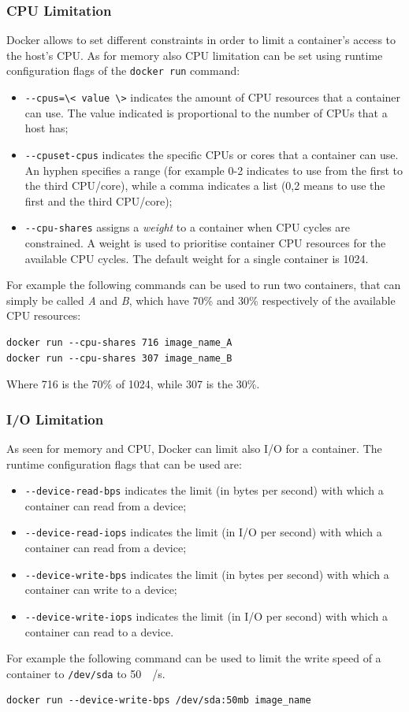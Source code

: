 \documentclass[a4paper,12pt]{article}
\newcommand{\file}[1]{\texttt{#1}\xspace}
\newcommand{\code}[1]{\lstinline|#1|}
\begin{document}
\subsubsection{CPU Limitation} 

Docker allows to set different constraints in order to limit a container's
access to the host's CPU. As for memory also CPU limitation can be set using
runtime configuration flags of the \code{docker run} command:
\begin{itemize}
  \item \code{--cpus=\< value \>} indicates the amount of CPU
  resources that a container can use. The value indicated is proportional to the
  number of CPUs that a host has;
  \item \code{--cpuset-cpus} indicates the specific CPUs or cores that a
  container can use. An hyphen specifies a range (for example 0-2 indicates to
  use from the first to the third CPU/core), while a comma indicates a list
  (0,2 means to use the first and the third CPU/core);
  \item \code{--cpu-shares} assigns a \textit{weight} to a container  when CPU
  cycles are constrained. A weight is used to prioritise container CPU resources
  for the available CPU cycles. The default weight for a single container is
  1024.
\end{itemize}
For example the following commands can be used to run two containers, that can
simply be called \textit{A} and \textit{B}, which have 70\% and 30\%
respectively of the available CPU resources:
\begin{lstlisting}
docker run --cpu-shares 716 image_name_A
docker run --cpu-shares 307 image_name_B
\end{lstlisting}
Where 716 is the 70\% of 1024, while 307 is the 30\%.


\subsubsection{I/O Limitation}

As seen for memory and CPU, Docker can limit also I/O for a container. The
runtime configuration flags that can be used are: 
\begin{itemize}
  \item \code{--device-read-bps} indicates the limit (in bytes per second)
  with which a container can read from a device;
  \item \code{--device-read-iops} indicates the limit (in I/O per second)
  with which a container can read from a device;
  \item \code{--device-write-bps} indicates the limit (in bytes per second)
  with which a container can write to a device;
  \item \code{--device-write-iops} indicates the limit (in I/O per second)
  with which a container can read to a device.
\end{itemize}
For example the following command can be used to limit the write speed of a
container to \file{/dev/sda} to \SI{50}{\mega\byte/\second}.
\begin{lstlisting}
docker run --device-write-bps /dev/sda:50mb image_name
\end{lstlisting}
\end{document}
